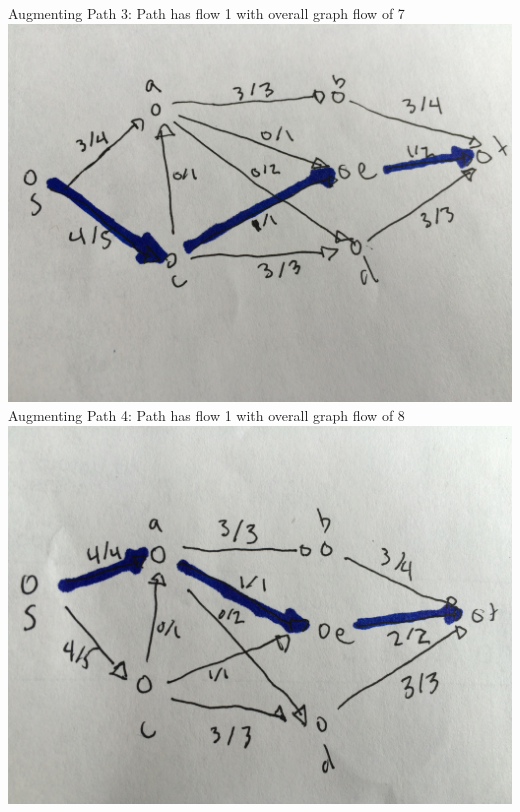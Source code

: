 \documentclass[11pt]{article}
\begin{document}
Augmenting Path 3: Path has flow 1 with overall graph flow of 7\\
\includegraphics[scale=.1]{IMG_5553.jpg} \\

Augmenting Path 4: Path has flow 1 with overall graph flow of 8\\
\includegraphics[scale=.1]{IMG_5554.jpg} \\
\end{document}
